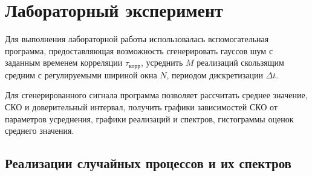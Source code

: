 \documentclass[a4paper,14pt]{extarticle}
\begin{document}



















\section{Лабораторный эксперимент}
Для выполнения лабораторной работы использовалась вспомогательная программа, предоставляющая возможность сгенерировать гауссов шум с заданным временем корреляции $\tau_\text{корр}$, усреднить $M$ реализаций скользящим средним с регулируемыми шириной окна $N$, периодом дискретизации $\Delta t$.

Для сгенерированного сигнала программа позволяет рассчитать среднее значение, СКО и доверительный интервал, получить графики зависимостей СКО от параметров усреднения, графики реализаций и спектров, гистограммы оценок среднего значения.

\subsection{Реализации случайных процессов и их спектров}
\end{document}
